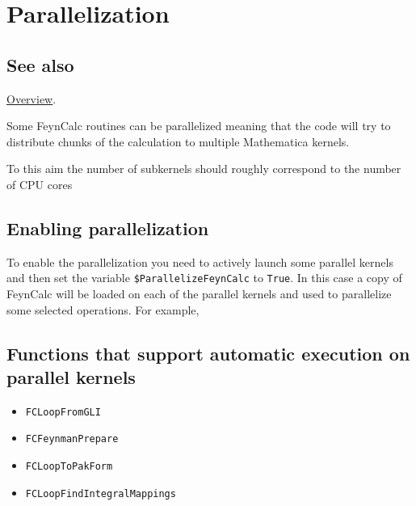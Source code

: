 \documentclass[../FeynCalcManual.tex]{subfiles}
\begin{document}
\hypertarget{parallelization}{
\section{Parallelization}\label{parallelization}}

\subsection{See also}

\hyperlink{toc}{Overview}.

Some FeynCalc routines can be parallelized meaning that the code will
try to distribute chunks of the calculation to multiple Mathematica
kernels.

To this aim the number of subkernels should roughly correspond to the
number of CPU cores

\hypertarget{enabling-parallelization}{%
\subsection{Enabling parallelization}\label{enabling-parallelization}}

To enable the parallelization you need to actively launch some parallel
kernels and then set the variable \texttt{\$ParallelizeFeynCalc} to
\texttt{True}. In this case a copy of FeynCalc will be loaded on each of
the parallel kernels and used to parallelize some selected operations.
For example,

\begin{Shaded}
\begin{Highlighting}[]
\OperatorTok{[}\OperatorTok{]}
\ExtensionTok{=} 
\end{Highlighting}
\end{Shaded}

\hypertarget{functions-that-support-automatic-execution-on-parallel-kernels}{%
\subsection{Functions that support automatic execution on parallel
kernels}\label{functions-that-support-automatic-execution-on-parallel-kernels}}

\begin{itemize}
\tightlist
\item
  \texttt{FCLoopFromGLI}
\item
  \texttt{FCFeynmanPrepare}
\item
  \texttt{FCLoopToPakForm}
\item
  \texttt{FCLoopFindIntegralMappings}
\end{itemize}
\end{document}
